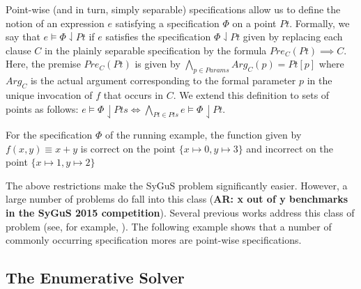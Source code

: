 \documentclass{llncs}
\newcommand\arsays[1]{{\bf AR: #1}}
\newcommand\Points{\mathit{Pts}}
\newcommand\Point{\mathit{Pt}}
\newcommand\Expr{e}
\newcommand\Spec{\Phi}
\newcommand\SynthFun{f}
\newcommand\FormalParameters{\mathit{Params}}
\begin{document}
Point-wise (and in turn, simply separable) specifications allow us to
define the notion of an expression $\Expr$ satisfying a specification
$\Spec$ on a point $\Point$.
Formally, we say that $\Expr \models \Spec \downharpoonleft
\Point$ if $\Expr$ satisfies the specification $\Spec \downharpoonleft
\Point$ given by replacing each clause $C$ in the plainly separable
specification by the formula $\mathit{Pre}_C(\Point) \implies C$.
Here, the premise $\mathit{Pre}_C(\Point)$ is given by $\bigwedge_{p \in
\FormalParameters} \mathit{Arg}_C(p) = \Point[p]$ where $\mathit{Arg}_C$ is the
actual argument corresponding to the formal parameter $p$ in the
unique invocation of $\SynthFun$ that occurs in $C$.
We extend this definition to sets of points as follows: $\Expr \models
\Spec \downharpoonleft \Points \Leftrightarrow \bigwedge_{\Point \in
\Points} \Expr \models \Spec\downharpoonleft\Point$.

\begin{example}
  \label{ex:running:correctness_on_point}
  For the specification $\Spec$ of the running example, the function
  given by $\SynthFun(x, y) \equiv x + y$ is correct on the point $\{ x
      \mapsto 0, y \mapsto 3 \}$ and incorrect on the point $\{ x
  \mapsto 1, y \mapsto 2 \}$
\end{example}

The above restrictions make the SyGuS problem significantly easier.
However, a large number of problems do fall into this class (\arsays{x
out of y benchmarks in the SyGuS 2015 competition}).
Several previous works address this class of problem (see, for
example, \cite{alur-15,madhusudan-16-pw,reynolds-15}).
The following example shows that a number of commonly occurring
specification mores are point-wise specifications.

\subsection{The Enumerative Solver}
\label{sec:enumeration}
\end{document}
